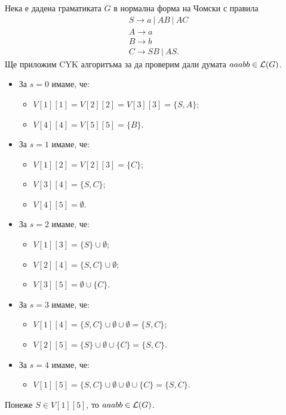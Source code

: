 \begin{example}
  Нека е дадена граматиката $G$ в нормална форма на Чомски с правила 
  \begin{align*}
    & S\rightarrow a\ |\ AB\ |\ AC\\
    & A\rightarrow a\\
    & B\rightarrow b\\
    & C\rightarrow SB\ |\ AS.
  \end{align*}
  Ще приложим CYK алгоритъма за да проверим дали думата $aaabb \in \mathcal{L}(G)$.
  \begin{itemize}
  \item 
    За $s = 0$ имаме, че:
    \begin{itemize}
    \item 
      $V[1][1] = V[2][2] = V[3][3] = \{S,A\}$;
    \item
      $V[4][4] = V[5][5] = \{B\}$.
    \end{itemize}
  \item
    За $s = 1$ имаме, че:
    \begin{itemize}
    \item
      $V[1][2] = V[2][3] = \{C\}$;
    \item
      $V[3][4] = \{S,C\}$;
    \item
      $V[4][5] = \emptyset$.
    \end{itemize}
  \item
    За $s = 2$ имаме, че:
    \begin{itemize}
    \item
      $V[1][3] = \{S\} \cup \emptyset$;
    \item
      $V[2][4] = \{S,C\} \cup \emptyset$;
    \item
      $V[3][5] = \emptyset \cup \{C\}$.
    \end{itemize}
  \item
    За $s = 3$ имаме, че:
    \begin{itemize}
    \item
      $V[1][4] = \{S,C\} \cup \emptyset \cup \emptyset = \{S,C\}$;
    \item
      $V[2][5] = \{S\} \cup \emptyset \cup \{C\} = \{S,C\}$.
    \end{itemize}
  \item
    За $s = 4$ имаме, че:
    \begin{itemize}
    \item 
      $V[1][5] = \{S,C\} \cup \emptyset \cup \emptyset \cup \{C\}= \{S,C\}$.
    \end{itemize}
  \end{itemize}
  Понеже $S \in V[1][5]$, то $aaabb \in \mathcal{L}(G)$.
\end{example}


